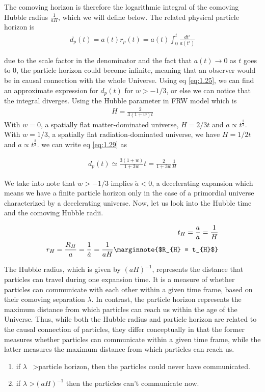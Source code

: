 The comoving horizon is therefore the logarithmic integral of the comoving Hubble radius $\frac{1}{aH}$, which we will define below. The related physical particle horizon is
\begin{align}
    d_p(t) = a(t) r_p(t) = a(t) \int_0^t \frac{ dt'}{a(t')} \label{eq:1.29}
\end{align}

due to the scale factor in the denominator and the fact that $a(t) \rightarrow 0$ as $t$ goes to 0, the particle horizon could become infinite, meaning that an observer would be in causal connection with the whole Universe. Using eq \ref{eq:1.25}, we can find an approximate expression for $d_p(t)$ for $w > -1/3$, or else we can notice that the integral diverges. Using the Hubble parameter in FRW model which is 
\begin{align}
    H = \frac{2}{3(1+w)t}
\end{align}
 With $w = 0$, a spatially flat matter-dominated universe, $H = 2/3t$ and $a \propto  t^ {\frac{2}{3}}$. With $w = 1/3$, a spatially flat radiation-dominated universe, we have $H = 1/2t$ and $a \propto  t^ {\frac{2}{3}}$.
we can write eq \ref{eq:1.29} as

\begin{align}
d_p(t) \simeq \frac{3(1+w)}{1+3w}t = \frac{2}{1+3w}\frac{1}{H}
\end{align}

We take into note that $w > -1/3$ implies $\ddot{a} < 0$, a decelerating expansion which means
we have a finite particle horizon only in the case of a primordial universe characterized by a decelerating universe.
Now, let us look into the Hubble time and the comoving Hubble radii.

\begin{align}
    t_{H} = \frac{a}{\dot{a}} = \frac{1}{H} \\                  
    r_{H} = \frac{R_{H}}{a} = \frac{1}{\dot{a}} = \frac{1}{aH} \marginnote{$R_{H} = t_{H}$}  \label{eq:1.33}
\end{align}

The Hubble radius, which is given by $(aH)^{-1}$, represents the distance that particles can travel during one expansion time. It is a measure of whether particles can communicate with each other within a given time frame, based on their comoving separation $\lambda$. In contrast, the particle horizon represents the maximum distance from which particles can reach us within the age of the Universe. Thus, while both the Hubble radius and particle horizon are related to the causal connection of particles, they differ conceptually in that the former measures whether particles can communicate within a given time frame, while the latter measures the maximum distance from which particles can reach us.
\begin{enumerate}
    \item if $\lambda$ \ \textgreater  particle horizon, then the particles could never have communicated.
    \item if $\lambda$ \textgreater  $(aH)^{-1}$ then the particles can't communicate now.
\end{enumerate}




